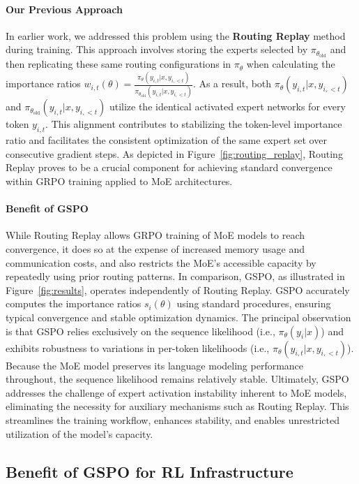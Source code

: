 \paragraph{Our Previous Approach} In earlier work, we addressed this problem using the \textbf{Routing Replay} method during training. This approach involves storing the experts selected by $\pi_{\theta_\text{old}}$ and then replicating these same routing configurations in $\pi_{\theta}$ when calculating the importance ratios $w_{i,t}(\theta) = \frac{ \pi_{\theta} (y_{i,t} | x, y_{i,<t}) }{ \pi_{\theta_\text{old}} (y_{i,t} | x,y_{i,<t})}$. As a result, both $\pi_{\theta} (y_{i,t} | x, y_{i,<t})$ and $\pi_{\theta_\text{old}} (y_{i,t} | x,y_{i,<t})$ utilize the identical activated expert networks for every token $y_{i,t}$. This alignment contributes to stabilizing the token-level importance ratio and facilitates the consistent optimization of the same expert set over consecutive gradient steps. As depicted in Figure~\ref{fig:routing_replay}, Routing Replay proves to be a crucial component for achieving standard convergence within GRPO training applied to MoE architectures.

\paragraph{Benefit of GSPO} While Routing Replay allows GRPO training of MoE models to reach convergence, it does so at the expense of increased memory usage and communication costs, and also restricts the MoE's accessible capacity by repeatedly using prior routing patterns. In comparison, GSPO, as illustrated in Figure~\ref{fig:results}, operates independently of Routing Replay. GSPO accurately computes the importance ratios $s_i(\theta)$ using standard procedures, ensuring typical convergence and stable optimization dynamics. The principal observation is that GSPO relies exclusively on the sequence likelihood (i.e., $\pi_{\theta} (y_i | x)$) and exhibits robustness to variations in per-token likelihoods (i.e., $\pi_{\theta} (y_{i,t} | x, y_{i,<t})$). Because the MoE model preserves its language modeling performance throughout, the sequence likelihood remains relatively stable. Ultimately, GSPO addresses the challenge of expert activation instability inherent to MoE models, eliminating the necessity for auxiliary mechanisms such as Routing Replay. This streamlines the training workflow, enhances stability, and enables unrestricted utilization of the model's capacity.

\subsection{Benefit of GSPO for RL Infrastructure}

